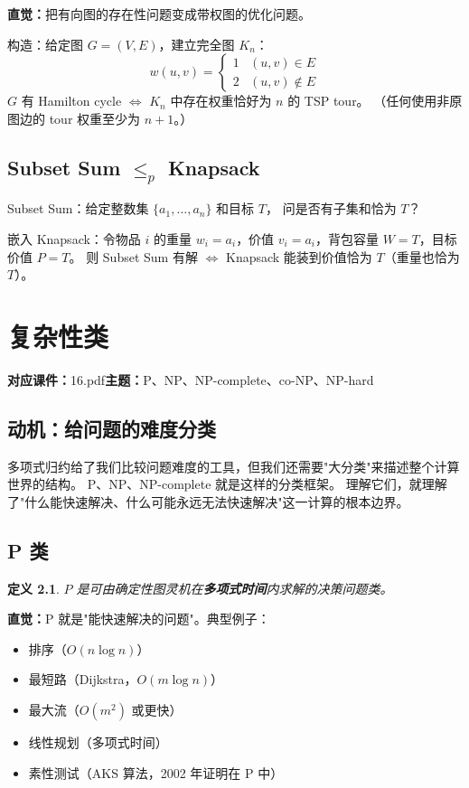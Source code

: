 \documentclass[UTF8,openany,12pt]{ctexbook}
\newtheorem{definition}{定义}[chapter]
\theoremstyle{remark}
\newcommand{\lecture}[3]{
  \chapter{#2}
  \noindent\textbf{对应课件：}#1\hfill\textbf{主题：}#3
  \vspace{0.6em}
}
\begin{document}
\textbf{直觉：}把有向图的存在性问题变成带权图的优化问题。

构造：给定图 $G=(V,E)$，建立完全图 $K_n$：
\[
  w(u,v) = \begin{cases} 1 & (u,v) \in E \\ 2 & (u,v) \notin E \end{cases}
\]
$G$ 有 Hamilton cycle $\iff$ $K_n$ 中存在权重恰好为 $n$ 的 TSP tour。
（任何使用非原图边的 tour 权重至少为 $n+1$。）

\section[Subset Sum 归约到 Knapsack]{Subset Sum $\le_p$ Knapsack}

Subset Sum：给定整数集 $\{a_1,\ldots,a_n\}$ 和目标 $T$，
问是否有子集和恰为 $T$？

嵌入 Knapsack：令物品 $i$ 的重量 $w_i = a_i$，价值 $v_i = a_i$，背包容量 $W = T$，目标价值 $P = T$。
则 Subset Sum 有解 $\iff$ Knapsack 能装到价值恰为 $T$（重量也恰为 $T$）。

\lecture{16.pdf}{复杂性类}{P、NP、NP-complete、co-NP、NP-hard}

\section*{动机：给问题的难度分类}

多项式归约给了我们比较问题难度的工具，但我们还需要"大分类"来描述整个计算世界的结构。
P、NP、NP-complete 就是这样的分类框架。
理解它们，就理解了"什么能快速解决、什么可能永远无法快速解决"这一计算的根本边界。

\section{P 类}

\begin{definition}
$P$ 是可由确定性图灵机在\textbf{多项式时间}内求解的决策问题类。
\end{definition}

\textbf{直觉：}P 就是"能快速解决的问题"。典型例子：
\begin{itemize}
  \item 排序（$O(n \log n)$）
  \item 最短路（Dijkstra，$O(m \log n)$）
  \item 最大流（$O(m^2)$ 或更快）
  \item 线性规划（多项式时间）
  \item 素性测试（AKS 算法，2002 年证明在 P 中）
\end{itemize}
\end{document}
